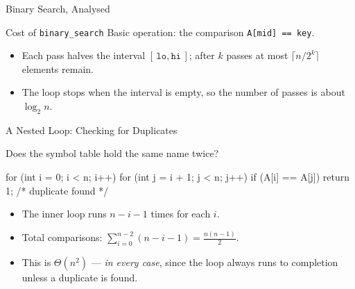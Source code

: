 \documentclass[aspectratio=169]{beamer}
\begin{document}
\begin{frame}{Binary Search, Analysed}
  \begin{block}{Cost of \texttt{binary\_search}}
    Basic operation: the comparison \texttt{A[mid] == key}.
  \end{block}
  \begin{itemize}
    \item Each pass halves the interval $[\,\texttt{lo}, \texttt{hi}\,]$; after
      $k$ passes at most $\lceil n/2^k \rceil$ elements remain.
    \item The loop stops when the interval is empty, so the number of passes is
      about $\log_2 n$.
  \end{itemize}
  \vspace{0.15cm}
\end{frame}

\begin{frame}[fragile]{A Nested Loop: Checking for Duplicates}
  \begin{block}{Does the symbol table hold the same name twice?}
\begin{semiverbatim}
for (int i = 0; i < n; i++)
    for (int j = i + 1; j < n; j++)
        if (A[i] == A[j])
            return 1;  /* duplicate found */
\end{semiverbatim}
  \end{block}
  \begin{itemize}
    \item The inner loop runs $n - i - 1$ times for each $i$.
    \item Total comparisons: $\sum_{i=0}^{n-2}(n-i-1) = \frac{n(n-1)}{2}$.
    \item This is $\Theta(n^2)$ --- \emph{in every case}, since the loop always
      runs to completion unless a duplicate is found.
  \end{itemize}
\end{frame}
\end{document}
